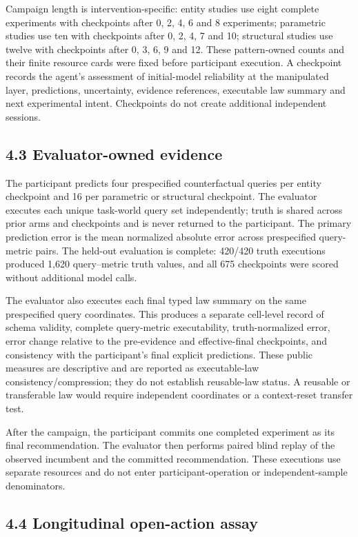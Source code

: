 \documentclass[10pt,twocolumn]{article}
\begin{document}
Campaign length is intervention-specific: entity studies use eight
complete experiments with checkpoints after 0, 2, 4, 6 and 8
experiments; parametric studies use ten with checkpoints after 0, 2, 4,
7 and 10; structural studies use twelve with checkpoints after 0, 3, 6,
9 and 12. These pattern-owned counts and their finite resource cards
were fixed before participant execution. A checkpoint records the
agent's assessment of initial-model reliability at the manipulated
layer, predictions, uncertainty, evidence references, executable law
summary and next experimental intent. Checkpoints do not create
additional independent sessions.

\subsection{4.3 Evaluator-owned
evidence}\label{evaluator-owned-evidence}

The participant predicts four prespecified counterfactual queries per
entity checkpoint and 16 per parametric or structural checkpoint. The
evaluator executes each unique task-world query set independently; truth
is shared across prior arms and checkpoints and is never returned to the
participant. The primary prediction error is the mean normalized
absolute error across prespecified query-metric pairs. The held-out
evaluation is complete: 420/420 truth executions produced 1,620
query--metric truth values, and all 675 checkpoints were scored without
additional model calls.

The evaluator also executes each final typed law summary on the same
prespecified query coordinates. This produces a separate cell-level
record of schema validity, complete query-metric executability,
truth-normalized error, error change relative to the pre-evidence and
effective-final checkpoints, and consistency with the participant's
final explicit predictions. These public measures are descriptive and
are reported as executable-law consistency/compression; they do not
establish reusable-law status. A reusable or transferable law would
require independent coordinates or a context-reset transfer test.

After the campaign, the participant commits one completed experiment as
its final recommendation. The evaluator then performs paired blind
replay of the observed incumbent and the committed recommendation. These
executions use separate resources and do not enter participant-operation
or independent-sample denominators.

\subsection{4.4 Longitudinal open-action
assay}\label{longitudinal-open-action-assay}
\end{document}
